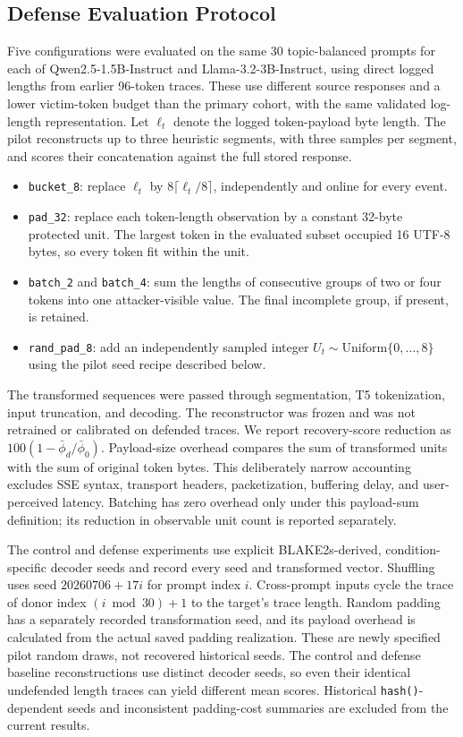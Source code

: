 \documentclass[electronics,article,submit,pdftex,moreauthors]{Definitions/mdpi}
\begin{document}
\subsection{Defense Evaluation Protocol}
Five configurations were evaluated on the same 30 topic-balanced prompts for each of Qwen2.5-1.5B-Instruct and Llama-3.2-3B-Instruct, using direct logged lengths from earlier 96-token traces. These use different source responses and a lower victim-token budget than the primary cohort, with the same validated log-length representation. Let $\ell_t$ denote the logged token-payload byte length. The pilot reconstructs up to three heuristic segments, with three samples per segment, and scores their concatenation against the full stored response.
\begin{itemize}[leftmargin=2em]
    \item \texttt{bucket\_8}: replace $\ell_t$ by $8\lceil \ell_t/8\rceil$, independently and online for every event.
    \item \texttt{pad\_32}: replace each token-length observation by a constant 32-byte protected unit. The largest token in the evaluated subset occupied 16 UTF-8 bytes, so every token fit within the unit.
    \item \texttt{batch\_2} and \texttt{batch\_4}: sum the lengths of consecutive groups of two or four tokens into one attacker-visible value. The final incomplete group, if present, is retained.
    \item \texttt{rand\_pad\_8}: add an independently sampled integer $U_t\sim\mathrm{Uniform}\{0,\ldots,8\}$ using the pilot seed recipe described below.
\end{itemize}
The transformed sequences were passed through segmentation, T5 tokenization, input truncation, and decoding. The reconstructor was frozen and was not retrained or calibrated on defended traces. We report recovery-score reduction as $100(1-\bar\phi_d/\bar\phi_0)$. Payload-size overhead compares the sum of transformed units with the sum of original token bytes. This deliberately narrow accounting excludes SSE syntax, transport headers, packetization, buffering delay, and user-perceived latency. Batching has zero overhead only under this payload-sum definition; its reduction in observable unit count is reported separately.

The control and defense experiments use explicit BLAKE2s-derived, condition-specific decoder seeds and record every seed and transformed vector. Shuffling uses seed $20260706+17i$ for prompt index $i$. Cross-prompt inputs cycle the trace of donor index $(i\bmod30)+1$ to the target's trace length. Random padding has a separately recorded transformation seed, and its payload overhead is calculated from the actual saved padding realization. These are newly specified pilot random draws, not recovered historical seeds. The control and defense baseline reconstructions use distinct decoder seeds, so even their identical undefended length traces can yield different mean scores. Historical \texttt{hash()}-dependent seeds and inconsistent padding-cost summaries are excluded from the current results.
\end{document}

